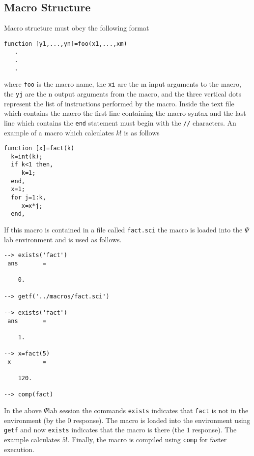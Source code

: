 \subsection{Macro Structure}
Macro structure must obey the following format
\begin{verbatim}
function [y1,...,yn]=foo(x1,...,xm)
   .
   .
   .
\end{verbatim}
where {\tt foo} is the macro name, the {\tt xi} are the m input arguments
to the macro,  the {\tt yj} are the n output arguments from the macro, and
the three vertical dots represent the list of instructions performed by
the macro.  Inside the text file which contains the macro the first line
containing the macro syntax and the last line which contains the {\tt end}
statement must begin with the {\tt //} characters.  An example of a macro
which calculates $k!$ is as follows
\begin{verbatim}
function [x]=fact(k)
  k=int(k);
  if k<1 then, 
     k=1; 
  end,
  x=1;
  for j=1:k,
     x=x*j;
  end,
\end{verbatim}
If this macro is contained in a file called {\tt fact.sci} the macro
is loaded into the $\Psi$lab environment and is used as follows.
\begin{verbatim}
--> exists('fact')
 ans       =
 
    0.  
 
--> getf('../macros/fact.sci')
 
--> exists('fact')
 ans       =
 
    1.  
 
--> x=fact(5)
 x         =
 
    120.  
 
--> comp(fact)
\end{verbatim}
In the above $\Psi$lab session the commands 
{\tt exists} indicates that
{\tt fact} is not in the environment (by the $0$ response).  The
macro is loaded into the environment using {\tt getf} and now {\tt exists}
indicates that the macro is there (the $1$ response).  The example 
calculates $5!$. Finally, the macro
is compiled using {\tt comp} for faster execution.

